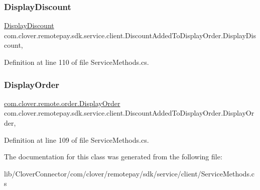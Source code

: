 \subsubsection{\texorpdfstring{Display\+Discount}{DisplayDiscount}}
{\footnotesize\ttfamily \hyperlink{classcom_1_1clover_1_1remote_1_1order_1_1_display_discount}{Display\+Discount} com.\+clover.\+remotepay.\+sdk.\+service.\+client.\+Discount\+Added\+To\+Display\+Order.\+Display\+Discount\hspace{0.3cm}{\ttfamily [get]}, {\ttfamily [set]}}



Definition at line 110 of file Service\+Methods.\+cs.

\mbox{\label{classcom_1_1clover_1_1remotepay_1_1sdk_1_1service_1_1client_1_1_discount_added_to_display_order_a6b39399dc9731b4f7f76534c392d12ca}} 
\subsubsection{\texorpdfstring{Display\+Order}{DisplayOrder}}
{\footnotesize\ttfamily \hyperlink{classcom_1_1clover_1_1remote_1_1order_1_1_display_order}{com.\+clover.\+remote.\+order.\+Display\+Order} com.\+clover.\+remotepay.\+sdk.\+service.\+client.\+Discount\+Added\+To\+Display\+Order.\+Display\+Order\hspace{0.3cm}{\ttfamily [get]}, {\ttfamily [set]}}



Definition at line 109 of file Service\+Methods.\+cs.



The documentation for this class was generated from the following file\+:\begin{DoxyCompactItemize}
\item 
lib/\+Clover\+Connector/com/clover/remotepay/sdk/service/client/Service\+Methods.\+cs\end{DoxyCompactItemize}
